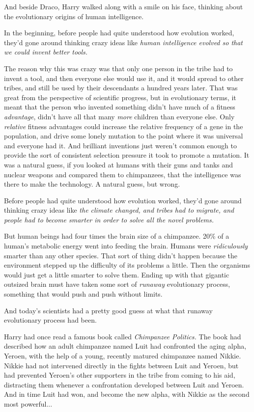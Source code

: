 And beside Draco, Harry walked along with a smile on his face, thinking about the evolutionary origins of human intelligence.

In the beginning, before people had quite understood how evolution worked, they'd gone around thinking crazy ideas like \emph{human intelligence evolved so that we could invent better tools.}

The reason why this was crazy was that only one person in the tribe had to invent a tool, and then everyone else would use it, and it would spread to other tribes, and still be used by their descendants a hundred years later. That was great from the perspective of scientific progress, but in evolutionary terms, it meant that the person who invented something didn't have much of a fitness \emph{advantage}, didn't have all that many \emph{more} children than everyone else. Only \emph{relative} fitness advantages could increase the relative frequency of a gene in the population, and drive some lonely mutation to the point where it was universal and everyone had it. And brilliant inventions just weren't common enough to provide the sort of consistent selection pressure it took to promote a mutation. It was a natural guess, if you looked at humans with their guns and tanks and nuclear weapons and compared them to chimpanzees, that the intelligence was there to make the technology. A natural guess, but wrong.

Before people had quite understood how evolution worked, they'd gone around thinking crazy ideas like \emph{the climate changed, and tribes had to migrate, and people had to become smarter in order to solve all the novel problems.}

But human beings had four times the brain size of a chimpanzee. 20\% of a human's metabolic energy went into feeding the brain. Humans were \emph{ridiculously} smarter than any other species. That sort of thing didn't happen because the environment stepped up the difficulty of its problems a little. Then the organisms would just get a little smarter to solve them. Ending up with that gigantic outsized brain must have taken some sort of \emph{runaway} evolutionary process, something that would push and push without limits.

And today's scientists had a pretty good guess at what that runaway evolutionary process had been.

Harry had once read a famous book called \emph{Chimpanzee Politics.} The book had described how an adult chimpanzee named Luit had confronted the aging alpha, Yeroen, with the help of a young, recently matured chimpanzee named Nikkie. Nikkie had not intervened directly in the fights between Luit and Yeroen, but had prevented Yeroen's other supporters in the tribe from coming to his aid, distracting them whenever a confrontation developed between Luit and Yeroen. And in time Luit had won, and become the new alpha, with Nikkie as the second most powerful...

